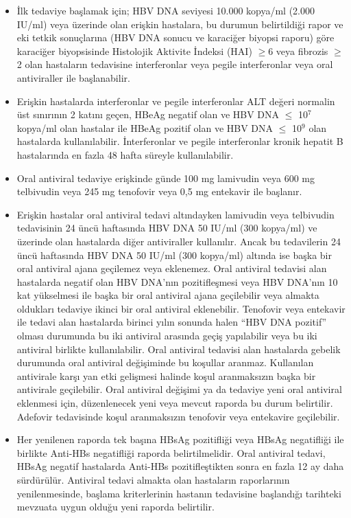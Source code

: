 \begin{itemize}
\item İlk tedaviye başlamak için; HBV DNA seviyesi 10.000 kopya/ml (2.000 IU/ml) veya üzerinde olan erişkin hastalara, bu durumun belirtildiği rapor ve eki tetkik sonuçlarına (HBV DNA sonucu ve karaciğer biyopsi raporu) göre karaciğer biyopsisinde Histolojik Aktivite İndeksi (HAI) $ \geq $6 veya fibrozis $ \geq $2 olan hastaların tedavisine interferonlar veya pegile interferonlar veya oral antiviraller ile başlanabilir. 

\item Erişkin hastalarda interferonlar ve pegile interferonlar ALT değeri normalin üst sınırının 2 katını geçen, HBeAg negatif olan ve HBV DNA $ \leq $ 10$ ^{7} $ kopya/ml olan hastalar ile HBeAg pozitif olan ve HBV DNA $ \leq $ 10$ ^{9} $ olan hastalarda kullanılabilir. İnterferonlar ve pegile interferonlar kronik hepatit B hastalarında en fazla 48 hafta süreyle kullanılabilir. 

\item Oral antiviral tedaviye erişkinde günde 100 mg lamivudin veya 600 mg telbivudin veya 245 mg tenofovir veya 0,5 mg entekavir ile başlanır. 

\item Erişkin hastalar oral antiviral tedavi altındayken lamivudin veya telbivudin tedavisinin 24 üncü haftasında HBV DNA 50 IU/ml (300 kopya/ml) ve üzerinde olan hastalarda diğer antiviraller kullanılır. Ancak bu tedavilerin 24 üncü haftasında HBV DNA 50 IU/ml (300 kopya/ml) altında ise başka bir oral antiviral ajana geçilemez veya eklenemez. Oral antiviral tedavisi alan hastalarda negatif olan HBV DNA’nın pozitifleşmesi veya HBV DNA’nın 10 kat yükselmesi ile başka bir oral antiviral ajana geçilebilir veya almakta oldukları tedaviye ikinci bir oral antiviral eklenebilir. Tenofovir veya entekavir ile tedavi alan hastalarda birinci yılın sonunda halen “HBV DNA pozitif” olması durumunda bu iki antiviral arasında geçiş yapılabilir veya bu iki antiviral birlikte kullanılabilir. Oral antiviral tedavisi alan hastalarda gebelik durumunda oral antiviral değişiminde bu koşullar aranmaz. Kullanılan antivirale karşı yan etki gelişmesi halinde koşul aranmaksızın başka bir antivirale geçilebilir. Oral antiviral değişimi ya da tedaviye yeni oral antiviral eklenmesi için, düzenlenecek yeni veya mevcut raporda bu durum belirtilir. Adefovir tedavisinde koşul aranmaksızın tenofovir veya entekavire geçilebilir.

\item Her yenilenen raporda tek başına HBsAg pozitifliği veya HBsAg negatifliği ile birlikte Anti-HBs negatifliği raporda belirtilmelidir. Oral antiviral tedavi, HBsAg negatif hastalarda Anti-HBs pozitifleştikten sonra en fazla 12 ay daha sürdürülür. Antiviral tedavi almakta olan hastaların raporlarının yenilenmesinde, başlama kriterlerinin hastanın tedavisine başlandığı tarihteki mevzuata uygun olduğu yeni raporda belirtilir.   

\end{itemize}




